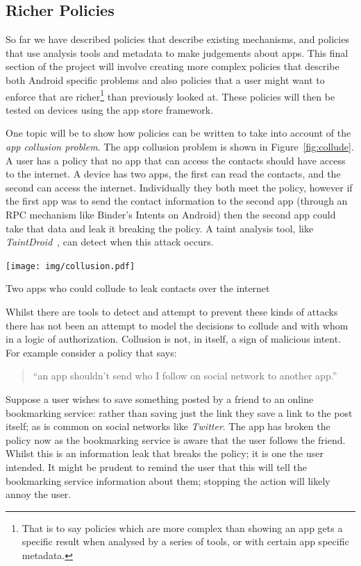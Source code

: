 \documentclass[a4paper]{article}
\begin{document}
\subsection{Richer Policies}

So far we have described policies that describe existing mechanisms, and
policies that use analysis tools and metadata to make judgements about apps.
This final section of the project will involve creating more complex policies
that describe both Android specific problems and also policies that a user might
want to enforce that are richer\footnote{That is to say policies which are more
  complex than showing an app gets a specific result when analysed by a series
  of tools, or with certain app specific metadata.} than previously looked at.
These policies will then be tested on devices using the app store framework.

One topic will be to show how policies can be written to take into account of
the \emph{app collusion problem}.  The app collusion problem is shown in
Figure~\ref{fig:collude}.  A user has a policy that no app that can access the
contacts should have access to the internet.  A device has two apps, the first
can read the contacts, and the second can access the internet.  Individually
they both meet the policy, however if the first app was to send the contact
information to the second app (through an \ac{RPC} mechanism like Binder's
Intents on Android) then the second app could take that data and leak it
breaking the policy.  A taint analysis tool, like
\emph{TaintDroid}~\cite{Enck:2010uw}, can detect when this attack occurs.

\begin{marginfigure}
  \texttt{[image: img/collusion.pdf]}
  \caption{Two apps who could collude to leak contacts over the internet}
  \label{fig:collude}
\end{marginfigure}

Whilst there are tools to detect and attempt to prevent these kinds of attacks
there has not been an attempt to model the decisions to collude and with whom in
a logic of authorization.  Collusion is not, in itself, a sign of malicious
intent.  For example consider a policy that says:
\begin{quote}
  ``an app shouldn't send who I follow on social network to another app.''
\end{quote}
Suppose a user wishes to save something posted by a friend to an online
bookmarking service: rather than saving just the link they save a link to the
post itself; as is common on social networks like \emph{Twitter}.  The app has
broken the policy now as the bookmarking service is aware that the user follows
the friend.  Whilst this is an information leak that breaks the policy; it is
one the user intended.  It might be prudent to remind the user that this will
tell the bookmarking service information about them; stopping the action
will likely annoy the user.
\end{document}

